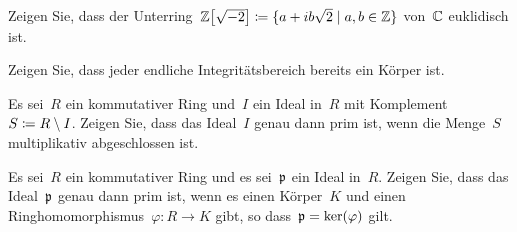 \documentclass{scrartcl}
\begin{document}
\begin{exercise}
  Zeigen Sie, dass der Unterring~$\Integer\bigl[ \sqrt{-2} \bigr] \defined \{ a + i b \sqrt{2} \suchthat a, b \in \Integer \}$ von~$\mathbb{C}$ euklidisch ist.
\end{exercise}

\begin{exercise}
  Zeigen Sie, dass jeder endliche Integritätsbereich bereits ein Körper ist.
\end{exercise}

\begin{exercise}
  Es sei~$R$ ein kommutativer Ring und~$I$ ein Ideal in~$R$ mit Komplement~$S \coloneqq R \setminus I$.
  Zeigen Sie, dass das Ideal~$I$ genau dann prim ist, wenn die Menge~$S$ multiplikativ abgeschlossen ist.
\end{exercise}



\begin{exercise}
  Es sei~$R$ ein kommutativer Ring und es sei~$\mathfrak{p}$ ein Ideal in~$R$.
  Zeigen Sie, dass das Ideal~$\mathfrak{p}$ genau dann prim ist, wenn es einen Körper~$K$ und einen Ringhomomorphismus~$\varphi \colon R \to K$ gibt, so dass~$\mathfrak{p} = \ker(\varphi)$ gilt.
\end{exercise}
\end{document}
